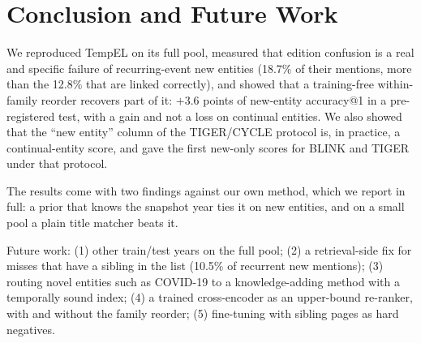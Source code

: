\documentclass[conference]{IEEEtran}
\begin{document}
\section{Conclusion and Future Work}

We reproduced TempEL on its full pool, measured that edition confusion is a real and specific failure
of recurring-event new entities (18.7\% of their mentions, more than the 12.8\% that are linked
correctly), and showed that a training-free within-family reorder recovers part of it: $+3.6$ points
of new-entity accuracy@1 in a pre-registered test, with a gain and not a loss on continual entities.
We also showed that the ``new entity'' column of the TIGER/CYCLE protocol is, in practice, a
continual-entity score, and gave the first new-only scores for BLINK and TIGER under that protocol.

The results come with two findings against our own method, which we report in full: a prior that
knows the snapshot year ties it on new entities, and on a small pool a plain title matcher beats it.

Future work: (1) other train/test years on the full pool; (2) a retrieval-side fix for misses that
have a sibling in the list (10.5\% of recurrent new mentions); (3) routing novel entities such as
COVID-19 to a knowledge-adding method with a temporally sound index; (4) a trained cross-encoder as an
upper-bound re-ranker, with and without the family reorder; (5) fine-tuning with sibling pages as hard
negatives.
\end{document}

